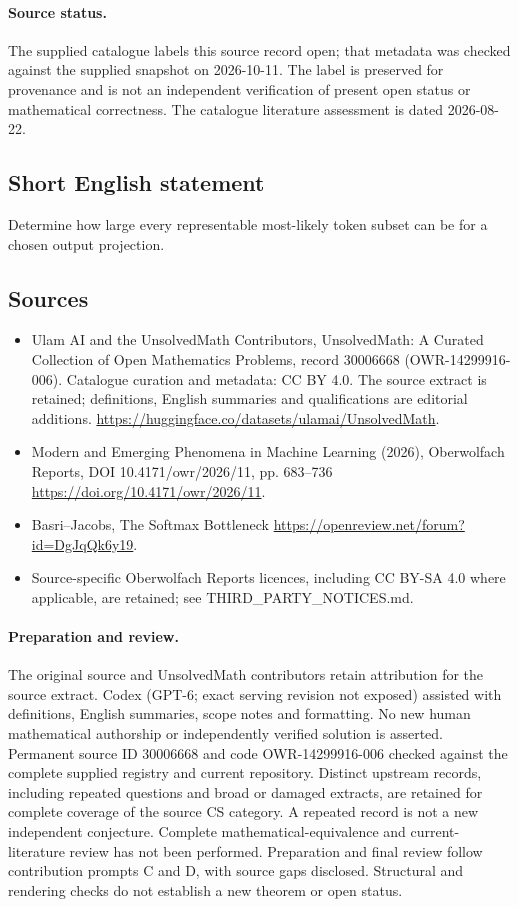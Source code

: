 \documentclass[11pt]{article}
\begin{document}
\paragraph{Source status.}
The supplied catalogue labels this source record open; that metadata was checked against the supplied snapshot on 2026-10-11. The label is preserved for provenance and is not an independent verification of present open status or mathematical correctness. The catalogue literature assessment is dated 2026-08-22.
\subsection{Short English statement}
Determine how large every representable most-likely token subset can be for a chosen output projection.
\subsection{Sources}
\begin{itemize}
\item[\hypertarget{source:30006668:1}{S1}] Ulam AI and the UnsolvedMath Contributors, UnsolvedMath: A Curated Collection of Open Mathematics Problems, record 30006668 (OWR-14299916-006). Catalogue curation and metadata: CC BY 4.0. The source extract is retained; definitions, English summaries and qualifications are editorial additions.
\url{https://huggingface.co/datasets/ulamai/UnsolvedMath}.
\item[\hypertarget{source:30006668:2}{S2}] Modern and Emerging Phenomena in Machine Learning (2026), Oberwolfach Reports, DOI 10.4171/owr/2026/11, pp. 683--736
\url{https://doi.org/10.4171/owr/2026/11}.
\item[\hypertarget{source:30006668:3}{S3}] Basri--Jacobs, The Softmax Bottleneck
\url{https://openreview.net/forum?id=DgJqQk6y19}.
\item Source-specific Oberwolfach Reports licences, including CC BY-SA 4.0 where applicable, are retained; see THIRD\_PARTY\_NOTICES.md.
\end{itemize}
\paragraph{Preparation and review.}
The original source and UnsolvedMath contributors retain attribution for the source extract. Codex (GPT-6; exact serving revision not exposed) assisted with definitions, English summaries, scope notes and formatting. No new human mathematical authorship or independently verified solution is asserted. Permanent source ID 30006668 and code OWR-14299916-006 checked against the complete supplied registry and current repository. Distinct upstream records, including repeated questions and broad or damaged extracts, are retained for complete coverage of the source CS category. A repeated record is not a new independent conjecture. Complete mathematical-equivalence and current-literature review has not been performed. Preparation and final review follow contribution prompts C and D, with source gaps disclosed. Structural and rendering checks do not establish a new theorem or open status.
\label{end:30006668}
\end{document}
